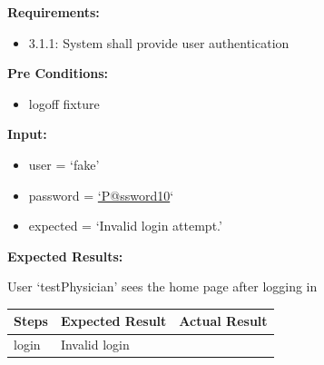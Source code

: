 \documentclass[letterpaper,10pt,english]{sphinxmanual}
\begin{document}

\begin{fulllineitems}
\label{STD/test_login:test_login.test_login_bad_user}
\textbf{Requirements:}
\begin{itemize}
\item {} 
3.1.1: System shall provide user authentication

\end{itemize}

\textbf{Pre Conditions:}
\begin{itemize}
\item {} 
logoff fixture

\end{itemize}

\textbf{Input:}
\begin{itemize}
\item {} 
user = `fake'

\item {} 
password = \href{mailto:'P@ssword10}{`P@ssword10}`

\item {} 
expected = `Invalid login attempt.'

\end{itemize}

\textbf{Expected Results:}

User `testPhysician' sees the home page after logging in

\begin{tabulary}{\linewidth}{|L|L|L|}
\hline
\textsf{\relax 
Steps
} & \textsf{\relax 
Expected Result
} & \textsf{\relax 
Actual Result
}\\
\hline
login
 & 
Invalid login
 & \\
\hline\end{tabulary}


\end{fulllineitems}

\end{document}
